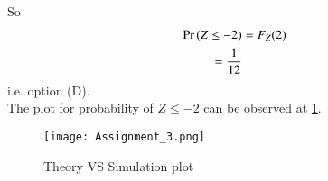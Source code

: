 \documentclass[journal,12pt,twocolumn]{IEEEtran}
\begin{document}
So 
\begin{align}
    \Pr\left( Z \leq -2\right) &= F_{Z}(2) \\
                  = \dfrac{1}{12}
\end{align}
i.e. option (D). \\
The plot for probability of $Z \le -2$ can be observed at \ref{Theory VS simulation plot}.
\begin{figure}[h!]
       \centering
    \texttt{[image: Assignment\_3.png]}
    \caption{Theory VS Simulation plot}
    \label{Theory VS simulation plot}
\end{figure}
\end{document}
